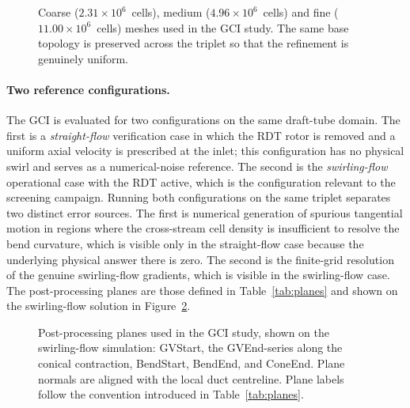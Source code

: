 \begin{figure}[h!]
  \centering
  \caption[Draft-tube meshes used in the GCI study]{Coarse ($2.31\times 10^6$~cells), medium ($4.96\times 10^6$~cells) and fine ($11.00\times 10^6$~cells) meshes used in the GCI study. The same base topology is preserved across the triplet so that the refinement is genuinely uniform.}
  \label{fig:gci_meshes}
\end{figure}

\paragraph{Two reference configurations.}
The GCI is evaluated for two configurations on the same draft-tube domain. The first is a \emph{straight-flow} verification case in which the RDT rotor is removed and a uniform axial velocity is prescribed at the inlet; this configuration has no physical swirl and serves as a numerical-noise reference. The second is the \emph{swirling-flow} operational case with the RDT active, which is the configuration relevant to the screening campaign. Running both configurations on the same triplet separates two distinct error sources. The first is numerical generation of spurious tangential motion in regions where the cross-stream cell density is insufficient to resolve the bend curvature, which is visible only in the straight-flow case because the underlying physical answer there is zero. The second is the finite-grid resolution of the genuine swirling-flow gradients, which is visible in the swirling-flow case. The post-processing planes are those defined in Table~\ref{tab:planes} and shown on the swirling-flow solution in Figure~\ref{fig:gci_planes}.

\begin{figure}[h!]
  \centering
  \caption[Post-processing planes used in the GCI study]{Post-processing planes used in the GCI study, shown on the swirling-flow simulation: GVStart, the GVEnd-series along the conical contraction, BendStart, BendEnd, and ConeEnd. Plane normals are aligned with the local duct centreline. Plane labels follow the convention introduced in Table~\ref{tab:planes}.}
  \label{fig:gci_planes}
\end{figure}


